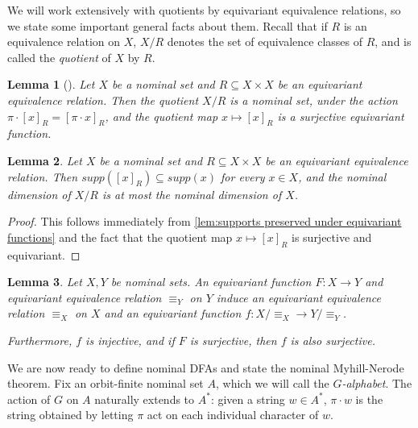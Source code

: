 \documentclass[11pt,a4paper]{amsart}
\newtheorem{lemma}{Lemma}
\theoremstyle{definition}
\newif\ifappendix
\begin{document}
We will work extensively with quotients by equivariant equivalence relations, so we state some important general facts about them.
Recall that if $R$ is an equivalence relation on $X$, $X/R$ denotes the set of equivalence classes of $R$, and is called the \emph{quotient} of $X$ by $R$.

\begin{lemma}[{\cite[Lemma 3.5]{bojanczyk-klin-lasota:automata-theory-in-nominal-sets}}] \label{lem:quotient by equivariant equivalence relation is nominal}
    Let $X$ be a nominal set and $R \subseteq X \times X$ be an equivariant equivalence relation. 
    Then the quotient $X / R$ is a nominal set, under the action $\pi \cdot [x]_R = [\pi \cdot x]_R$, and the quotient map $x \mapsto [x]_R$ is a surjective equivariant function.
\end{lemma}

\begin{lemma} \label{lem:dimension of quotient at most dimension of original}
    Let $X$ be a nominal set and $R \subseteq X \times X$ be an equivariant equivalence relation.
    Then $supp([x]_R) \subseteq supp(x)$ for every $x \in X$, and the nominal dimension of $X/R$ is at most the nominal dimension of $X$.
\end{lemma}
\begin{proof}
    This follows immediately from \autoref{lem:supports preserved under equivariant functions} and the fact that the quotient map $x \mapsto [x]_R$ is surjective and equivariant.
\end{proof}


\begin{lemma} \label{lem:induced equivariant equivalence relations}
    Let $X, Y$ be nominal sets.
    An equivariant function $F : X \to Y$ and equivariant equivalence relation $\equiv_Y$ on $Y$ induce an equivariant equivalence relation $\equiv_X$ on $X$ and an equivariant function $f : X / \equiv_X \to Y / \equiv_Y$.

    Furthermore, $f$ is injective, and if $F$ is surjective, then $f$ is also surjective.
\end{lemma}


\ifappendix A proof of \autoref{lem:induced equivariant equivalence relations} is given in Appendix \ref{appendix:proof of induced equivariant equivalence relations}. \fi


We are now ready to define nominal DFAs and state the nominal Myhill-Nerode theorem.
Fix an orbit-finite nominal set $A$, which we will call the \textit{$G$-alphabet}. 
The action of $G$ on $A$ naturally extends to $A^*$: given a string $w \in A^*$, $\pi \cdot w$ is the string obtained by letting $\pi$ act on each individual character of $w$.  
\end{document}
